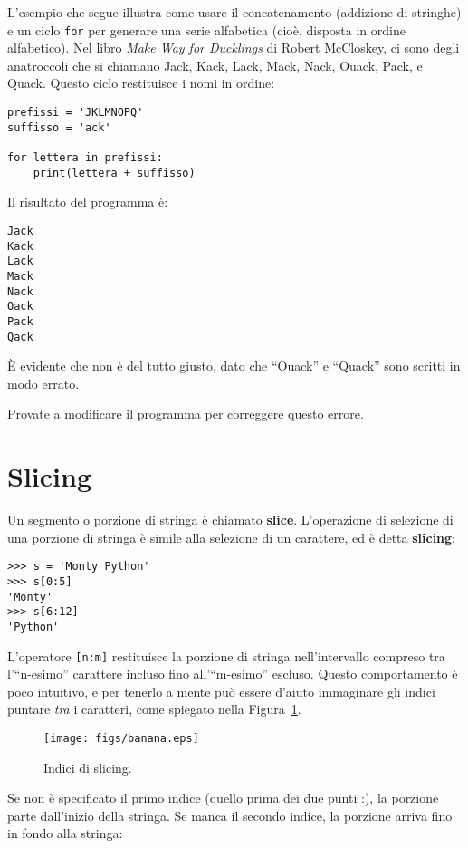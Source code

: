 \documentclass[10pt]{book}
\begin{document}
L'esempio che segue illustra come usare il concatenamento (addizione di stringhe) e un ciclo {\tt for} per generare una serie alfabetica (cioè, disposta in ordine alfabetico). Nel libro {\em Make Way for Ducklings} di Robert McCloskey, ci sono degli anatroccoli che si chiamano Jack, Kack, Lack, Mack, Nack, Ouack, Pack, e Quack.  Questo ciclo restituisce i nomi in ordine:

\begin{verbatim}
prefissi = 'JKLMNOPQ'
suffisso = 'ack'

for lettera in prefissi:
    print(lettera + suffisso)
\end{verbatim}
%
Il risultato del programma è:

\begin{verbatim}
Jack
Kack
Lack
Mack
Nack
Oack
Pack
Qack
\end{verbatim}
%
È evidente che non è del tutto giusto, dato che ``Ouack'' e ``Quack'' sono scritti in modo errato.

Provate a modificare il programma per correggere questo errore.


\section{Slicing}
\label{slice}

Un segmento o porzione di stringa è chiamato {\bf slice}. L'operazione di selezione di una porzione di stringa è simile alla selezione di un carattere, ed è detta {\bf slicing}:

\begin{verbatim}
>>> s = 'Monty Python'
>>> s[0:5]
'Monty'
>>> s[6:12]
'Python'
\end{verbatim}
%
L'operatore {\tt [n:m]} restituisce la porzione di stringa nell'intervallo compreso tra l'``n-esimo'' carattere incluso fino all'``m-esimo'' escluso. Questo comportamento è poco intuitivo, e per tenerlo a mente può essere d'aiuto immaginare gli indici puntare {\em tra} i caratteri, come spiegato nella Figura~\ref{fig.banana}.

\begin{figure}
\centerline
{\texttt{[image: figs/banana.eps]}}
\caption{Indici di slicing.}
\label{fig.banana}
\end{figure}


Se non è specificato il primo indice (quello prima dei due punti :), la porzione parte dall'inizio della stringa. Se manca il secondo indice, la porzione arriva fino in fondo alla stringa:
\end{document}
